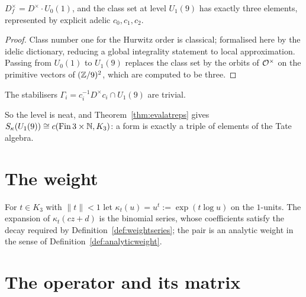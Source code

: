 \begin{theorem}
  \label{thm:jacobs-classset}
  \leanok
  $D_f^\times = D^\times \cdot U_0(1)$, and the class set at level $U_1(9)$ has exactly three
  elements, represented by explicit adelic $c_0, c_1, c_2$.
\end{theorem}

\begin{proof}
  \leanok
  Class number one for the Hurwitz order is classical; formalised here by the idelic dictionary,
  reducing a global integrality statement to local approximation.  Passing from $U_0(1)$ to
  $U_1(9)$ replaces the class set by the orbits of $\mathcal{O}^\times$ on the primitive vectors of
  $(\mathbb{Z}/9)^2$, which are computed to be three.
\end{proof}

\begin{lemma}
  \label{lem:jacobs-neat}
  \leanok
  The stabilisers $\Gamma_i = c_i^{-1}D^\times c_i \cap U_1(9)$ are trivial.
\end{lemma}

So the level is neat, and Theorem~\ref{thm:evalatreps} gives $S_\kappa(U_1(9)) \cong c(\mathrm{Fin}\,3
\times \mathbb{N}, K_3)$: a form is exactly a triple of elements of the Tate algebra.

\section{The weight}

\begin{definition}
  \label{def:jacobs-weight}
  \leanok
  For $t \in K_3$ with $\lVert t \rVert < 1$ let $\kappa_t(u) = u^t := \exp(t \log u)$ on the
  $1$-units.  The expansion of $\kappa_t(cz+d)$ is the binomial series, whose coefficients
  satisfy the decay required by Definition~\ref{def:weightseries}; the pair is an analytic weight
  in the sense of Definition~\ref{def:analyticweight}.
\end{definition}


\section{The operator and its matrix}

